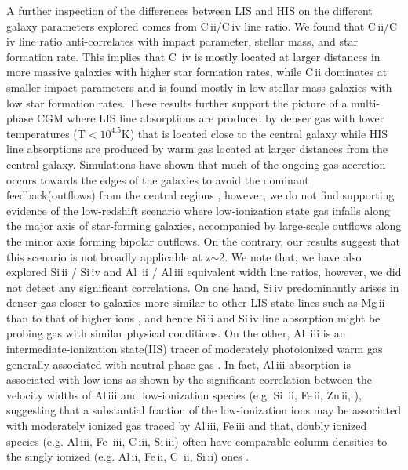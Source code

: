 \documentclass[longauth]{aa}
\begin{document}
A further inspection of the differences between LIS and HIS on the different
galaxy parameters explored comes from C\,{\sc ii}/C\,{\sc iv} line ratio. We
found that C\,{\sc ii}/C\,{\sc iv} line ratio anti-correlates with impact
parameter, stellar mass, and star formation rate.  This implies that C\,
{\sc iv} is mostly located at larger distances in more massive
galaxies with higher star formation rates, while C\,{\sc ii} dominates at
smaller impact parameters and is found mostly in low stellar mass
galaxies with low star formation rates. These results further support the
picture of a multi-phase CGM where LIS line absorptions are produced by
denser gas with lower temperatures (T$<10^{4.5}$K) that is located close to
the central galaxy while HIS line absorptions are produced by warm gas
located at larger distances from the central galaxy. Simulations have shown
that much of the ongoing gas accretion occurs towards the edges of the
galaxies to avoid the dominant feedback(outflows) from the central regions
\citep{Stewart12,Fernandez12,Putman17}, however, we do not find supporting
evidence of the low-redshift scenario where low-ionization state gas infalls
along the major axis of star-forming galaxies, accompanied by large-scale
outflows along the minor axis forming bipolar outflows. On the contrary, our
results suggest that this scenario is not broadly applicable at z$\sim$2. We
note that, we have also explored Si\,{\sc ii} / Si\,{\sc iv} and  Al\,
{\sc ii} / Al\,{\sc iii} equivalent width line ratios, however, we did not
detect any significant correlations. On one hand, Si\,{\sc iv} predominantly
arises in denser gas closer to galaxies more similar to other LIS state
lines such as Mg\,{\sc ii} than to that of higher ions \citep
{Ford13,Ford14}, and hence Si\,{\sc ii} and Si\,{\sc iv} line absorption
might be probing gas with similar physical conditions. On the other, Al\,
{\sc iii} is an intermediate-ionization state(IIS) tracer of moderately
photoionized warm gas generally associated with neutral phase gas \citep
{Savage01,Knauth03,Vladilo01}. In fact, Al\,{\sc iii} absorption is
associated with low-ions as shown by the significant correlation between the
velocity widths of Al\,{\sc iii} and low-ionization species (e.g. Si\,
{\sc ii}, Fe\,{\sc ii}, Zn\,{\sc ii}, \citealt{Howk99b}), suggesting that a
substantial fraction of the low-ionization ions may be associated with
moderately ionized gas traced by Al\,{\sc iii}, Fe\,{\sc iii}
\citep{Wolfe05} and that, doubly ionized species (e.g. Al\,{\sc iii}, Fe\,
{\sc iii}, C\,{\sc iii}, Si\,{\sc iii}) often have comparable column
densities to the singly ionized (e.g. Al\,{\sc ii}, Fe\,{\sc ii}, C\,
{\sc ii}, Si\,{\sc ii}) ones \citep{Mas-Ribas17b}.
\end{document}
